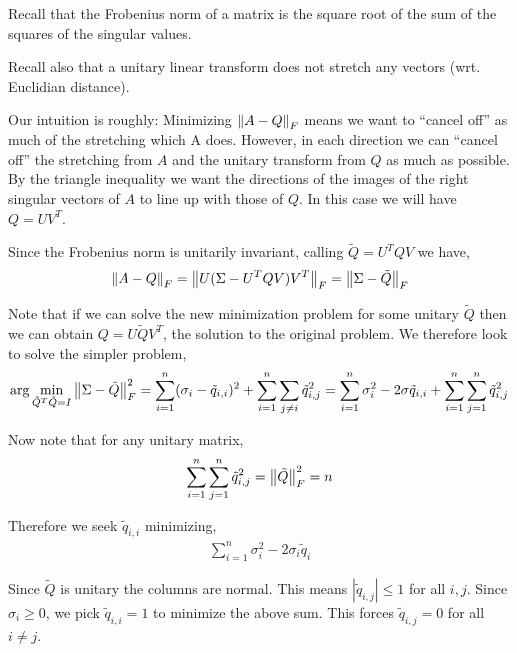\documentclass[10pt]{article}
\begin{document}
\begin{solution}[Solution]
Recall that the Frobenius norm of a matrix is the square root of the sum of the squares of the singular values.

Recall also that a unitary linear transform does not stretch any vectors (wrt. Euclidian distance). 

Our intuition is roughly: Minimizing \( \left\lVert A-Q\right\rVert_F \) means we want to ``cancel off'' as much of the stretching which A does. However, in each direction we can ``cancel off'' the stretching from \( A \) and the unitary transform from \( Q \) as much as possible. By the triangle inequality we want the directions of the images of the right singular vectors of \( A \) to line up with those of \( Q \). In this case we will have \( Q = UV^T \).

    
Since the Frobenius norm is unitarily invariant, calling \( \tilde{Q} = U^TQV \) we have,
\begin{align*}
    \left\lVert A-Q\right\rVert_F = \left\lVert U(\Sigma-U^TQV)V^T\right\rVert_F = \left\lVert\Sigma-\tilde{Q}\right\rVert_F 
\end{align*}

Note that if we can solve the new minimization problem for some unitary \( \tilde{Q} \) then we can obtain \( Q = U\tilde{Q}V^T \), the solution to the original problem.
We therefore look to solve the simpler problem,
\begin{align*}
    \arg\min_{\tilde{Q}^T\tilde{Q}=I} \left\lVert\Sigma-\tilde{Q}\right\rVert_F^2 = \sum_{i=1}^{n} (\sigma_i - \tilde{q}_{i,i})^2 + \sum_{i=1}^{n} \sum_{j\neq i} \tilde{q}_{i,j}^2 
    = \sum_{i=1}^{n} \sigma_i^2 -2\sigma \tilde{q}_{i,i} + \sum_{i=1}^{n}\sum_{j=1}^n \tilde{q}_{i,j}^2
\end{align*}

Now note that for any unitary matrix,
\begin{align*}
    \sum_{i=1}^{n} \sum_{j=1}^{n} \tilde{q}_{i,j}^2 = \left\lVert\tilde{Q}\right\rVert_F^2 = n
\end{align*}

Therefore we seek \( \tilde{q}_{i,i} \) minimizing,
\begin{align*}
    \sum_{i=1}^{n} \sigma_i^2 - 2\sigma_i \tilde{q}_i
\end{align*}

    Since \( \tilde{Q} \) is unitary the columns are normal. This means \( |\tilde{q}_{i,j}| \leq 1 \) for all \( i,j \). Since \( \sigma_i \geq 0 \), we pick \( \tilde{q}_{i,i} = 1 \) to minimize the above sum. This forces \( \tilde{q}_{i,j} = 0 \) for all \( i\neq j \).


\end{solution}
\end{document}

